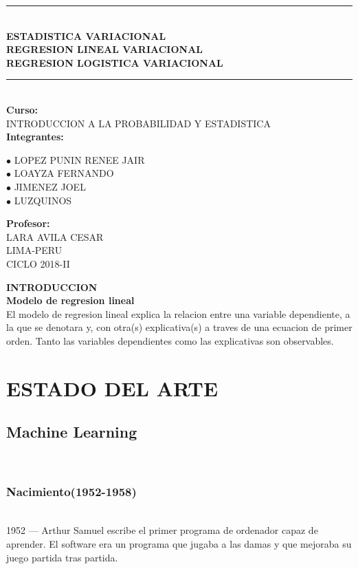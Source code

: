 \documentclass[a4paper,11pt]{article}
\begin{document}
	\begin{center}
		\rule{15cm}{0.8mm}\\
		\vspace*{3mm}
		{\bf ESTADISTICA VARIACIONAL\\
		REGRESION LINEAL VARIACIONAL\\
		REGRESION LOGISTICA VARIACIONAL}
		\rule{15cm}{0.8mm}\\
		\vspace*{4mm}
		{\bf Curso:}\\
		INTRODUCCION A LA PROBABILIDAD Y ESTADISTICA\\
		\vspace*{4mm}
		{\bf Integrantes:}\\
		\begin{flushleft}
			\hspace{5cm}$\bullet$ LOPEZ PUNIN RENEE JAIR\\
			\hspace{5cm}$\bullet$ LOAYZA FERNANDO\\
			\hspace{5cm}$\bullet$ JIMENEZ JOEL\\
			\hspace{5cm}$\bullet$ LUZQUINOS\\
		\end{flushleft}
		\vspace*{4mm}
		{\bf Profesor:}\\
		LARA AVILA CESAR\\
		\vspace*{6cm}
		LIMA-PERU\\
		CICLO 2018-II
	\end{center}
	\newpage
	{\bf INTRODUCCION}\\
	\textbf{Modelo de regresion lineal}\\
	El modelo de regresion lineal explica la relacion entre una variable dependiente, a la
	que se denotara y, con otra(s) explicativa(s) a traves de una ecuacion de primer orden.
	Tanto las variables dependientes como las explicativas son observables.
	
	\section{\bf ESTADO DEL ARTE}
	\subsection{Machine Learning}\\
	\subsubsection{Nacimiento(1952-1958)}\\
	1952 — Arthur Samuel escribe el primer programa de ordenador 
	capaz de aprender. El software era un programa que jugaba a 
	las damas y que mejoraba su juego partida tras partida.
	\\
	
\end{document}
